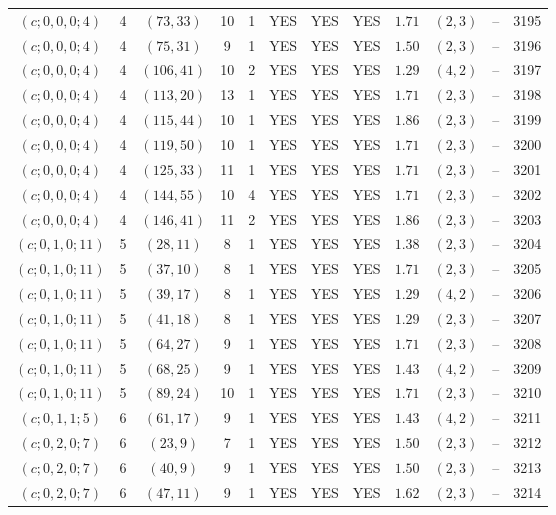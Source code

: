 \begin{longtable}{|c|c|c|c|c|c|c|c|c|c|c|c|}
$(c;0,0,0;4)$ & 4 & $(73,33)$ & 10 & 1 & YES & YES & YES & $1.71$ & $(2,3)$ & -- & 3195\\
$(c;0,0,0;4)$ & 4 & $(75,31)$ & 9 & 1 & YES & YES & YES & $1.50$ & $(2,3)$ & -- & 3196\\
$(c;0,0,0;4)$ & 4 & $(106,41)$ & 10 & 2 & YES & YES & YES & $1.29$ & $(4,2)$ & -- & 3197\\
$(c;0,0,0;4)$ & 4 & $(113,20)$ & 13 & 1 & YES & YES & YES & $1.71$ & $(2,3)$ & -- & 3198\\
$(c;0,0,0;4)$ & 4 & $(115,44)$ & 10 & 1 & YES & YES & YES & $1.86$ & $(2,3)$ & -- & 3199\\
$(c;0,0,0;4)$ & 4 & $(119,50)$ & 10 & 1 & YES & YES & YES & $1.71$ & $(2,3)$ & -- & 3200\\
$(c;0,0,0;4)$ & 4 & $(125,33)$ & 11 & 1 & YES & YES & YES & $1.71$ & $(2,3)$ & -- & 3201\\
$(c;0,0,0;4)$ & 4 & $(144,55)$ & 10 & 4 & YES & YES & YES & $1.71$ & $(2,3)$ & -- & 3202\\
$(c;0,0,0;4)$ & 4 & $(146,41)$ & 11 & 2 & YES & YES & YES & $1.86$ & $(2,3)$ & -- & 3203\\
$(c;0,1,0;11)$ & 5 & $(28,11)$ & 8 & 1 & YES & YES & YES & $1.38$ & $(2,3)$ & -- & 3204\\
$(c;0,1,0;11)$ & 5 & $(37,10)$ & 8 & 1 & YES & YES & YES & $1.71$ & $(2,3)$ & -- & 3205\\
$(c;0,1,0;11)$ & 5 & $(39,17)$ & 8 & 1 & YES & YES & YES & $1.29$ & $(4,2)$ & -- & 3206\\
$(c;0,1,0;11)$ & 5 & $(41,18)$ & 8 & 1 & YES & YES & YES & $1.29$ & $(2,3)$ & -- & 3207\\
$(c;0,1,0;11)$ & 5 & $(64,27)$ & 9 & 1 & YES & YES & YES & $1.71$ & $(2,3)$ & -- & 3208\\
$(c;0,1,0;11)$ & 5 & $(68,25)$ & 9 & 1 & YES & YES & YES & $1.43$ & $(4,2)$ & -- & 3209\\
$(c;0,1,0;11)$ & 5 & $(89,24)$ & 10 & 1 & YES & YES & YES & $1.71$ & $(2,3)$ & -- & 3210\\
$(c;0,1,1;5)$ & 6 & $(61,17)$ & 9 & 1 & YES & YES & YES & $1.43$ & $(4,2)$ & -- & 3211\\
$(c;0,2,0;7)$ & 6 & $(23,9)$ & 7 & 1 & YES & YES & YES & $1.50$ & $(2,3)$ & -- & 3212\\
$(c;0,2,0;7)$ & 6 & $(40,9)$ & 9 & 1 & YES & YES & YES & $1.50$ & $(2,3)$ & -- & 3213\\
$(c;0,2,0;7)$ & 6 & $(47,11)$ & 9 & 1 & YES & YES & YES & $1.62$ & $(2,3)$ & -- & 3214\\

\end{longtable}

